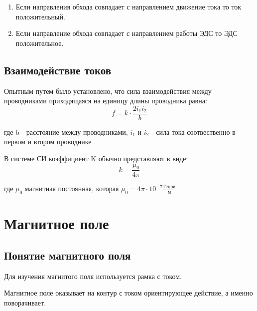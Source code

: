 \documentclass[../main.tex]{subfiles}
\begin{document}
\begin{enumerate}
    \item Если направления обхода совпадает с направлением движение тока то ток положительный.
    \item Если направление обхода совпадает с направлением работы ЭДС то ЭДС положительное.
\end{enumerate}

\subsection{Взаимодействие токов}

Опытным путем было установлено, что сила взаимодействия между проводниками приходящаяся на единицу длины проводника равна:
\[f = k \cdot \frac{2 i_1 i_2}{b}\]
\begin{center}
    где b - расстояние между проводниками, $i_1$ и $i_2$ - сила тока соотвественно в первом и втором проводнике
\end{center}

В системе СИ коэффициент K обычно представляют в виде:
\[k = \frac{\mu_0}{4 \pi}\]
\begin{center}
    где $\mu_0$ магнитная постоянная, которая $\mu_0 = 4\pi \cdot 10^{-7} \frac{\text{Генри}}{\text{м}}$
\end{center}

\section{Магнитное поле}
\subsection{Понятие магнитного поля}
Для изучения магнитого поля используется рамка с током.

Магнитное поле оказывает на контур с током ориентирующее действие, а именно поворачивает.
\end{document}
